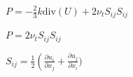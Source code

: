 \documentclass{article}
\begin{document}
$ P = -\frac{2}{3}k\text{div}(U) + 2\nu_t S_{ij}S_{ij}$
\pagebreak

$P = 2 \nu_t S_{ij}S_{ij}$
\pagebreak

$S_{ij} = \frac{1}{2}\left(\frac{\partial u_i}{\partial x_j} + \frac{\partial u_j}{\partial x_i})$
\pagebreak
\end{document}
